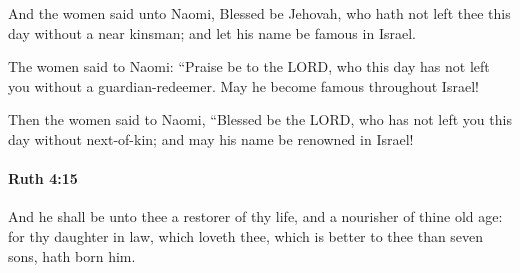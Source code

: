 			\begin{versebox}
					\item[BHS] 
					\item[LXX] 
					\item[ASV] And the women said unto Naomi, Blessed be Jehovah, who hath not left thee this day without a near kinsman; and let his name be famous in Israel.
					\item[NIV] The women said to Naomi: “Praise be to the LORD, who this day has not left you without a guardian-redeemer. May he become famous throughout Israel!
					\item[NRSV] Then the women said to Naomi, “Blessed be the LORD, who has not left you this day without next-of-kin; and may his name be renowned in Israel!
			\end{versebox}

		\paragraph{Ruth 4:15} %
			\label{RUTH-4-15}

			And he shall be unto thee a restorer of thy life, and a nourisher of thine old age: for thy daughter in law, which loveth thee, which is better to thee than seven sons, hath born him.

